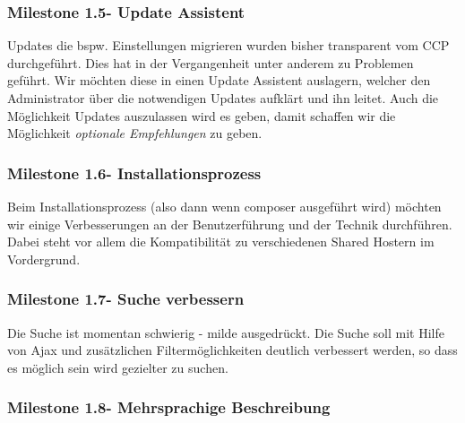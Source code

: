 \documentclass[
paper=a4,
draft=false,%
fontsize=10pt%
]{scrartcl}
\begin{document}
\subsubsection[Milestone 1.5 - Update Assistent]{Milestone 1.5\footnotemark - Update Assistent}

Updates die bspw. Einstellungen migrieren wurden bisher transparent vom CCP durchgeführt. Dies hat in der Vergangenheit unter anderem zu Problemen geführt. Wir möchten diese in einen Update Assistent auslagern, welcher den Administrator über die notwendigen Updates aufklärt und ihn leitet. Auch die Möglichkeit Updates auszulassen wird es geben, damit schaffen wir die Möglichkeit \textit{optionale Empfehlungen} zu geben.

\subsubsection[Milestone 1.6 - Installationsprozess]{Milestone 1.6\footnotemark - Installationsprozess}

Beim Installationsprozess (also dann wenn composer ausgeführt wird) möchten wir einige Verbesserungen an der Benutzerführung und der Technik durchführen. Dabei steht vor allem die Kompatibilität zu verschiedenen Shared Hostern im Vordergrund.

\subsubsection[Milestone 1.7 - Suche verbessern]{Milestone 1.7\footnotemark - Suche verbessern}

Die Suche ist momentan schwierig - milde ausgedrückt. Die Suche soll mit Hilfe von Ajax und zusätzlichen Filtermöglichkeiten deutlich verbessert werden, so dass es möglich sein wird gezielter zu suchen.

\subsubsection[Milestone 1.8 - Mehrsprachige Beschreibung]{Milestone 1.8\footnotemark - Mehrsprachige Beschreibung}
\end{document}
